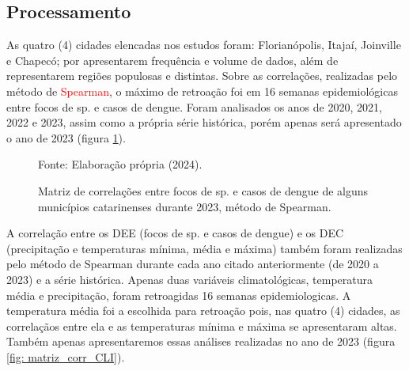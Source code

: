 \documentclass[
	12pt,				%
	openright,			%
	oneside,			%
	a4paper,			%
	english,			%
	french,				%
	spanish,			%
	brazil				%
	dvipsnames, table]{abntex2}
\begin{document}
\subsection{Processamento}

\indent As quatro (4) cidades elencadas nos estudos foram: Florianópolis, Itajaí, Joinville e Chapecó; por apresentarem frequência e volume de dados, além de representarem regiões populosas e distintas. Sobre as correlações, realizadas pelo método de \textcolor{red}{Spearman}, o máximo de retroação foi em 16 semanas epidemiológicas entre focos de  sp. e casos de dengue. Foram analisados os anos de 2020, 2021, 2022 e 2023, assim como a própria série histórica, porém apenas será apresentado o ano de 2023 (figura \ref{fig: matriz_corr_DEE}).

\begin{figure}[htbp]
    \centering
    \caption{Matriz de correlações entre focos de  sp. e casos de dengue de alguns municípios catarinenses durante 2023, método de Spearman.}
    \label{fig: matriz_corr_DEE}
    \hfill
    \hfill
    \small{Fonte: Elaboração própria (2024).}
\end{figure}

\indent A correlação entre os \acrshort{DEE} (focos de  sp. e casos de dengue) e os \acrshort{DEC} (precipitação e temperaturas mínima, média e máxima) também foram realizadas pelo método de Spearman durante cada ano citado anteriormente (de 2020 a 2023) e a série histórica. Apenas duas variáveis climatológicas, temperatura média e precipitação, foram retroagidas 16 semanas epidemiologicas. A temperatura média foi a escolhida para retroação pois, nas quatro (4) cidades, as correlaçãos entre ela e as temperaturas mínima e máxima se apresentaram altas. Também apenas apresentaremos essas análises realizadas no ano de 2023 (figura \ref{fig: matriz_corr_CLI}).
\end{document}
